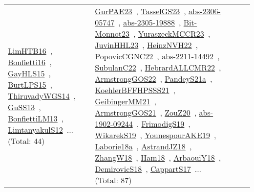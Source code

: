 {\begin{longtable}{lp{3cm}>{\raggedright\arraybackslash}p{6cm}>{\raggedright\arraybackslash}p{6cm}>{\raggedright\arraybackslash}p{8cm}}
\href{works/LimHTB16.pdf}{LimHTB16}~\cite{LimHTB16}, \href{works/Bonfietti16.pdf}{Bonfietti16}~\cite{Bonfietti16}, \href{works/GayHLS15.pdf}{GayHLS15}~\cite{GayHLS15}, \href{works/BurtLPS15.pdf}{BurtLPS15}~\cite{BurtLPS15}, \href{works/ThiruvadyWGS14.pdf}{ThiruvadyWGS14}~\cite{ThiruvadyWGS14}, \href{works/GuSS13.pdf}{GuSS13}~\cite{GuSS13}, \href{works/BonfiettiLM13.pdf}{BonfiettiLM13}~\cite{BonfiettiLM13}, \href{works/LimtanyakulS12.pdf}{LimtanyakulS12}~\cite{LimtanyakulS12}... (Total: 44) & \href{works/GurPAE23.pdf}{GurPAE23}~\cite{GurPAE23}, \href{works/TasselGS23.pdf}{TasselGS23}~\cite{TasselGS23}, \href{works/abs-2306-05747.pdf}{abs-2306-05747}~\cite{abs-2306-05747}, \href{works/abs-2305-19888.pdf}{abs-2305-19888}~\cite{abs-2305-19888}, \href{works/Bit-Monnot23.pdf}{Bit-Monnot23}~\cite{Bit-Monnot23}, \href{works/YuraszeckMCCR23.pdf}{YuraszeckMCCR23}~\cite{YuraszeckMCCR23}, \href{works/JuvinHHL23.pdf}{JuvinHHL23}~\cite{JuvinHHL23}, \href{works/HeinzNVH22.pdf}{HeinzNVH22}~\cite{HeinzNVH22}, \href{works/PopovicCGNC22.pdf}{PopovicCGNC22}~\cite{PopovicCGNC22}, \href{works/abs-2211-14492.pdf}{abs-2211-14492}~\cite{abs-2211-14492}, \href{works/SubulanC22.pdf}{SubulanC22}~\cite{SubulanC22}, \href{works/HebrardALLCMR22.pdf}{HebrardALLCMR22}~\cite{HebrardALLCMR22}, \href{works/ArmstrongGOS22.pdf}{ArmstrongGOS22}~\cite{ArmstrongGOS22}, \href{works/PandeyS21a.pdf}{PandeyS21a}~\cite{PandeyS21a}, \href{works/KoehlerBFFHPSSS21.pdf}{KoehlerBFFHPSSS21}~\cite{KoehlerBFFHPSSS21}, \href{works/GeibingerMM21.pdf}{GeibingerMM21}~\cite{GeibingerMM21}, \href{works/ArmstrongGOS21.pdf}{ArmstrongGOS21}~\cite{ArmstrongGOS21}, \href{works/ZouZ20.pdf}{ZouZ20}~\cite{ZouZ20}, \href{works/abs-1902-09244.pdf}{abs-1902-09244}~\cite{abs-1902-09244}, \href{works/FrimodigS19.pdf}{FrimodigS19}~\cite{FrimodigS19}, \href{works/WikarekS19.pdf}{WikarekS19}~\cite{WikarekS19}, \href{works/YounespourAKE19.pdf}{YounespourAKE19}~\cite{YounespourAKE19}, \href{works/Laborie18a.pdf}{Laborie18a}~\cite{Laborie18a}, \href{works/AstrandJZ18.pdf}{AstrandJZ18}~\cite{AstrandJZ18}, \href{works/ZhangW18.pdf}{ZhangW18}~\cite{ZhangW18}, \href{works/Ham18.pdf}{Ham18}~\cite{Ham18}, \href{works/ArbaouiY18.pdf}{ArbaouiY18}~\cite{ArbaouiY18}, \href{works/DemirovicS18.pdf}{DemirovicS18}~\cite{DemirovicS18}, \href{works/CappartS17.pdf}{CappartS17}~\cite{CappartS17}... (Total: 87)\\

\end{longtable}}

